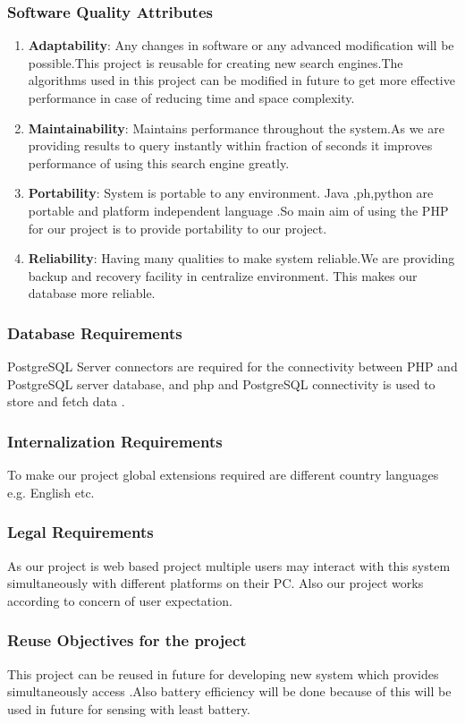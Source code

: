 \documentclass[11pt,fleqn]{book} %
\begin{document}
\subsubsection{Software Quality Attributes}
\begin{enumerate}
\item \textbf{Adaptability}: Any changes in software or any advanced modification will be possible.This project is reusable for creating new search engines.The algorithms used in this project can be modified in future to get more effective performance in case of reducing time and space complexity.
\item \textbf{Maintainability}: Maintains performance throughout the system.As we are providing results to query instantly within fraction of seconds it improves performance of using this search engine greatly.
\item \textbf{Portability}: System is portable to any environment. Java ,ph,python are portable and platform independent language .So main aim of using the PHP for our project is to provide portability to our project.
\item \textbf{Reliability}: Having many qualities to make system reliable.We are providing backup and recovery facility in centralize environment. This makes our database more reliable.
 \end{enumerate}
\subsubsection{\color{ocre}Database Requirements}
PostgreSQL Server  connectors are required for the connectivity between PHP and PostgreSQL server database, and php and PostgreSQL connectivity is used to store and fetch data .
\subsubsection{\color{ocre}Internalization Requirements}
To make our project global extensions required are different country languages e.g. English etc.
\subsubsection{\color{ocre}Legal Requirements}
As our project is web based project multiple users may interact with this system simultaneously with different platforms on their PC. Also our project works according to concern of user expectation. 
\subsubsection{\color{ocre}Reuse Objectives for the project}
This project can be reused in future for developing new system which provides simultaneously access .Also battery efficiency will be done because of this will be used in future for sensing  with least battery.
\end{document}
